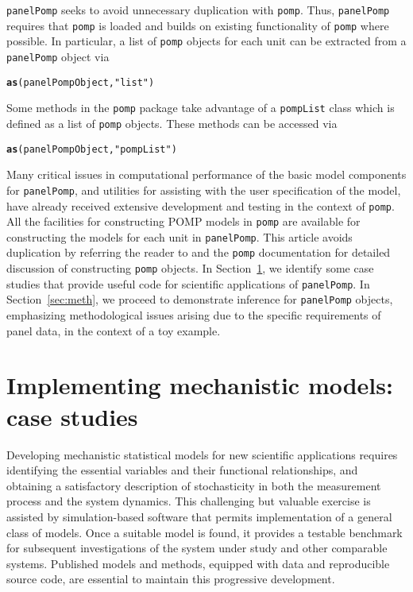 \documentclass[12pt]{article}\usepackage[]{graphicx}\usepackage[table]{xcolor}
\makeatletter
\newcommand{\hlsng}[1]{\textcolor[rgb]{0.192,0.494,0.8}{#1}}%
\newcommand{\hldef}[1]{\textcolor[rgb]{0.345,0.345,0.345}{#1}}%
\newcommand{\hlkwd}[1]{\textcolor[rgb]{0.737,0.353,0.396}{\textbf{#1}}}%
\newenvironment{kframe}{%
 \def\at@end@of@kframe{}%
 \ifinner\ifhmode%
  \def\at@end@of@kframe{\end{minipage}}%
  \begin{minipage}{\columnwidth}%
 \fi\fi%
 \def\FrameCommand##1{\hskip\@totalleftmargin \hskip-\fboxsep
 \colorbox{shadecolor}{##1}\hskip-\fboxsep
     \hskip-\linewidth \hskip-\@totalleftmargin \hskip\columnwidth}%
 \MakeFramed {\advance\hsize-\width
   \@totalleftmargin\z@ \linewidth\hsize
   \@setminipage}}%
 {\par\unskip\endMakeFramed%
 \at@end@of@kframe}
\newenvironment{knitrout}{}{} %
\newcommand\pkg{\texttt}
\newcommand\code{\texttt}
\newcommand\panelPomp{\texttt{panelPomp}\xspace}
\newcommand\pomp{\texttt{pomp}\xspace}
\makeatother
\begin{document}
\panelPomp seeks to avoid unnecessary duplication with \pomp.
Thus, \panelPomp requires that \pomp is loaded and builds on existing functionality of \pomp where possible.
In particular, a list of \code{pomp} objects for each unit can be extracted from a \code{panelPomp} object via
\begin{knitrout}
\color{fgcolor}\begin{kframe}
\begin{alltt}
\hlkwd{as}\hldef{(panelPompObject,}\hlsng{"list"}\hldef{)}
\end{alltt}
\end{kframe}
\end{knitrout}
Some methods in the \pkg{pomp} package take advantage of a \code{pompList} class which is defined as a list of \code{pomp} objects.
These methods can be accessed via
\begin{knitrout}
\color{fgcolor}\begin{kframe}
\begin{alltt}
\hlkwd{as}\hldef{(panelPompObject,}\hlsng{"pompList"}\hldef{)}
\end{alltt}
\end{kframe}
\end{knitrout}
Many critical issues in computational performance of the basic model components for \panelPomp, and utilities for assisting with the user specification of the model, have already received extensive development and testing in the context of \pomp.
All the facilities for constructing POMP models in \pomp are available for constructing the models for each unit in \panelPomp.
This article avoids duplication by referring the reader to \citet{king16} and the \pomp documentation for detailed discussion of constructing \code{pomp} objects.
In Section~\ref{sec:examples}, we identify some case studies that provide useful code for scientific applications of \panelPomp.
In Section~\ref{sec:meth}, we proceed to demonstrate inference for \code{panelPomp} objects, emphasizing methodological issues arising due to the specific requirements of panel data,  in the context of a toy example.

\section{Implementing mechanistic models: case studies}
\label{sec:examples}

Developing mechanistic statistical models for new scientific applications requires identifying the essential variables and their functional relationships, and obtaining a satisfactory description of stochasticity in both the measurement process and the system dynamics.
This challenging but valuable exercise is assisted by simulation-based software that permits implementation of a general class of models.
Once a suitable model is found, it provides a testable benchmark for subsequent investigations of the system under study and other comparable systems.
Published models and methods, equipped with data and reproducible source code, are essential to maintain this progressive development.
\end{document}

